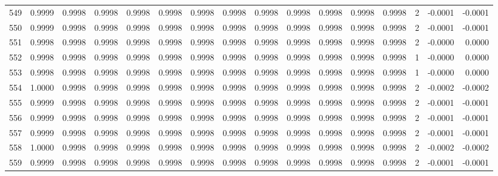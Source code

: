 \begin{tabular}{lrrrrrrrrrrrrrrr}
549 &      0.9999 &  0.9998 &  0.9998 &  0.9998 &  0.9998 &  0.9998 &  0.9998 &  0.9998 &  0.9998 &  0.9998 &   0.9998 &     0.9998 &      2 &                   -0.0001 &                    -0.0001 \\
550 &      0.9999 &  0.9998 &  0.9998 &  0.9998 &  0.9998 &  0.9998 &  0.9998 &  0.9998 &  0.9998 &  0.9998 &   0.9998 &     0.9998 &      2 &                   -0.0001 &                    -0.0001 \\
551 &      0.9998 &  0.9998 &  0.9998 &  0.9998 &  0.9998 &  0.9998 &  0.9998 &  0.9998 &  0.9998 &  0.9998 &   0.9998 &     0.9998 &      2 &                   -0.0000 &                     0.0000 \\
552 &      0.9998 &  0.9998 &  0.9998 &  0.9998 &  0.9998 &  0.9998 &  0.9998 &  0.9998 &  0.9998 &  0.9998 &   0.9998 &     0.9998 &      1 &                   -0.0000 &                     0.0000 \\
553 &      0.9998 &  0.9998 &  0.9998 &  0.9998 &  0.9998 &  0.9998 &  0.9998 &  0.9998 &  0.9998 &  0.9998 &   0.9998 &     0.9998 &      1 &                   -0.0000 &                     0.0000 \\
554 &      1.0000 &  0.9998 &  0.9998 &  0.9998 &  0.9998 &  0.9998 &  0.9998 &  0.9998 &  0.9998 &  0.9998 &   0.9998 &     0.9998 &      2 &                   -0.0002 &                    -0.0002 \\
555 &      0.9999 &  0.9998 &  0.9998 &  0.9998 &  0.9998 &  0.9998 &  0.9998 &  0.9998 &  0.9998 &  0.9998 &   0.9998 &     0.9998 &      2 &                   -0.0001 &                    -0.0001 \\
556 &      0.9999 &  0.9998 &  0.9998 &  0.9998 &  0.9998 &  0.9998 &  0.9998 &  0.9998 &  0.9998 &  0.9998 &   0.9998 &     0.9998 &      2 &                   -0.0001 &                    -0.0001 \\
557 &      0.9999 &  0.9998 &  0.9998 &  0.9998 &  0.9998 &  0.9998 &  0.9998 &  0.9998 &  0.9998 &  0.9998 &   0.9998 &     0.9998 &      2 &                   -0.0001 &                    -0.0001 \\
558 &      1.0000 &  0.9998 &  0.9998 &  0.9998 &  0.9998 &  0.9998 &  0.9998 &  0.9998 &  0.9998 &  0.9998 &   0.9998 &     0.9998 &      2 &                   -0.0002 &                    -0.0002 \\
559 &      0.9999 &  0.9998 &  0.9998 &  0.9998 &  0.9998 &  0.9998 &  0.9998 &  0.9998 &  0.9998 &  0.9998 &   0.9998 &     0.9998 &      2 &                   -0.0001 &                    -0.0001 \\

\end{tabular}
